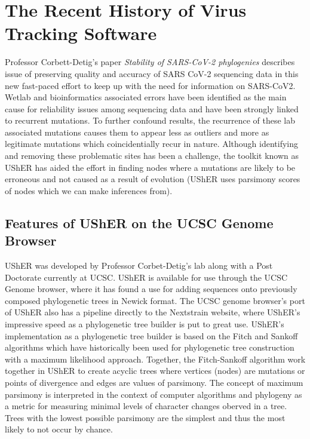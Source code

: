 \documentclass[12pt,journal,compsoc]{IEEEtran}
\begin{document}
\section{The Recent History of Virus Tracking Software}
Professor Corbett-Detig's paper \emph{Stability of SARS-CoV-2 phylogenies}\cite{usher:PLOS} describes issue of preserving quality and accuracy of SARS CoV-2 sequencing data in this new fast-paced effort to keep up with the need for information on SARS-CoV2. Wetlab and bioinformatics associated errors have been identified as the main cause for reliability issues among sequencing data and have been strongly linked to recurrent mutations. To further confound results, the recurrence of these lab associated mutations causes them to appear less as outliers and more as legitimate mutations which coincidentially recur in nature. Although identifying and removing these problematic sites has been a challenge, the toolkit known as UShER has aided the effort in finding nodes where a mutations are likely to be erroneous and not caused as a result of evolution (UShER uses parsimony scores of nodes which we can make inferences from). 
\subsection*{Features of UShER on the UCSC Genome Browser}
UShER was developed by Professor Corbet-Detig's lab along with a Post Doctorate currently at UCSC. UShER is available for use through the UCSC Genome browser, where it has found a use for adding sequences onto previously composed phylogenetic trees in Newick format. The UCSC genome browser's port of UShER also has a pipeline directly to the Nextstrain website, where UShER's impressive speed as a phylogenetic tree builder is put to great use. UShER's implementation as a phylogenetic tree builder is based on the Fitch and Sankoff algorithms which have historically been used for phylogenetic tree construction with a maximum likelihood approach. Together, the Fitch-Sankoff algorithm work together in UShER to create acyclic trees where vertices (nodes) are mutations or points of divergence and edges are values of parsimony. The concept of maximum parsimony is interpreted in the context of computer algorithms and phylogeny as a metric for measuring minimal levels of character changes oberved in a tree. Trees with the lowest possible parsimony are the simplest and thus the most likely to not occur by chance. 
\end{document}
